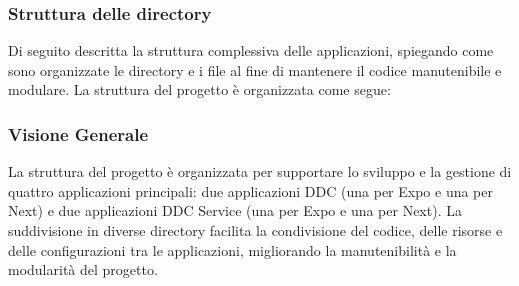 \pagebreak
\subsubsection{Struttura delle directory}
\label{subsec:strutturadirectory}

Di seguito descritta la struttura complessiva delle applicazioni, spiegando come sono organizzate le directory e i file al fine di mantenere il codice manutenibile e modulare. La struttura del progetto è organizzata come segue:
{\tiny{}}

\subsubsection{Visione Generale}
La struttura del progetto è organizzata per supportare lo sviluppo e la gestione di quattro applicazioni principali: 
due applicazioni DDC (una per Expo e una per Next) e due applicazioni DDC Service (una per Expo e una per Next).
La suddivisione in diverse directory facilita la condivisione del codice, delle risorse e delle configurazioni tra le applicazioni, migliorando la manutenibilità e la modularità del progetto.

